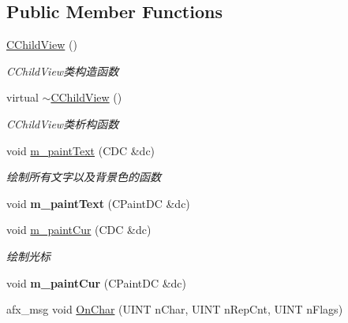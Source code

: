 \subsection*{Public Member Functions}
\begin{DoxyCompactItemize}
\item 
\mbox{\label{class_c_child_view_aff5af7c162c10755edbe58f260ded6d4}} 
\hyperlink{class_c_child_view_aff5af7c162c10755edbe58f260ded6d4}{C\+Child\+View} ()
\begin{DoxyCompactList}\small\item\em C\+Child\+View类构造函数 \end{DoxyCompactList}\item 
\mbox{\label{class_c_child_view_a5b033b5e0a130950719a173b86418698}} 
virtual \hyperlink{class_c_child_view_a5b033b5e0a130950719a173b86418698}{$\sim$\+C\+Child\+View} ()
\begin{DoxyCompactList}\small\item\em C\+Child\+View类析构函数 \end{DoxyCompactList}\item 
void \hyperlink{class_c_child_view_a4764e41ed2ac3f2ce69916b3881894fe}{m\+\_\+paint\+Text} (C\+DC \&dc)
\begin{DoxyCompactList}\small\item\em 绘制所有文字以及背景色的函数 ~\newline
\end{DoxyCompactList}\item 
\mbox{\label{class_c_child_view_a5acb3356732e7ea39a4468855f90fc85}} 
void {\bfseries m\+\_\+paint\+Text} (C\+Paint\+DC \&dc)
\item 
void \hyperlink{class_c_child_view_a434383ba85ab567141366ecddeb2c9d6}{m\+\_\+paint\+Cur} (C\+DC \&dc)
\begin{DoxyCompactList}\small\item\em 绘制光标 ~\newline
\end{DoxyCompactList}\item 
\mbox{\label{class_c_child_view_a40222a570c569017c93dd3fc088aa893}} 
void {\bfseries m\+\_\+paint\+Cur} (C\+Paint\+DC \&dc)
\item 
afx\+\_\+msg void \hyperlink{class_c_child_view_af29ede94259b52b2ad54d139ff554abe}{On\+Char} (U\+I\+NT n\+Char, U\+I\+NT n\+Rep\+Cnt, U\+I\+NT n\+Flags)

\end{DoxyCompactItemize}
